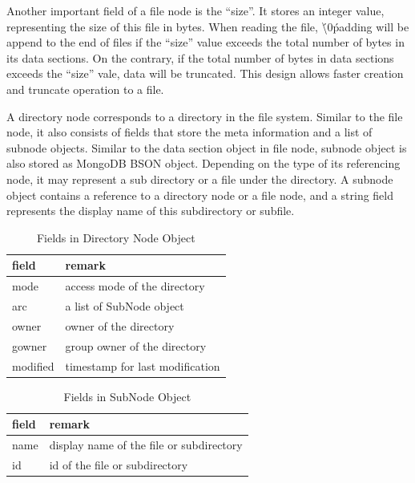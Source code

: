     Another important field of a file node is the “size”. It stores an integer value, representing the size of this file in bytes. When reading the file, \'\textbackslash0\' padding will be append to the end of files if the “size” value exceeds the total number of bytes in its data sections. On the contrary, if the total number of bytes in data sections exceeds the “size” vale, data will be truncated. This design allows faster creation and truncate operation to a file.

    A directory node corresponds to a directory in the file system. Similar to the file node, it also consists of fields that store the meta information and a list of subnode objects. Similar to the data section object in file node, subnode object is also stored as MongoDB BSON object. Depending on the type of its referencing node, it may represent a sub directory or a file under the directory. A subnode object contains a reference to a directory node or a file node, and a string field represents the display name of this subdirectory or subfile.

\begin{table}
\caption{Fields in Directory Node Object}
\label{tab:dir_fields}
\begin{center}
\begin{tabular}{ll}
\toprule
field & remark\\
\midrule
mode & access mode of the directory\\
arc & a list of SubNode object\\
owner & owner of the directory\\
gowner & group owner of the directory\\
modified & timestamp for last modification\\
\bottomrule
\end{tabular}
\end{center}
\end{table}

\begin{table}
\caption{Fields in SubNode Object}
\label{tab:subnode_fields}
\begin{center}
\begin{tabular}{ll}
\toprule
field & remark\\
\midrule
name & display name of the file or subdirectory\\
id & id of the file or subdirectory\\
\bottomrule
\end{tabular}
\end{center}
\end{table}

